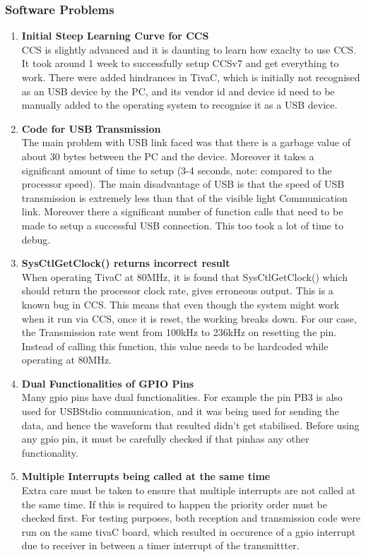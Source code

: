 \documentclass{article}
\begin{document}
\subsubsection{Software Problems}
\begin{enumerate}
\item \textbf{Initial Steep Learning Curve for CCS}\\
  CCS is slightly advanced and it is daunting to learn how exaclty to use CCS. It took around 1 week to successfully setup CCSv7 and get everything to work. There were added hindrances in TivaC, which is initially not recognised as an USB device by the PC, and its vendor id and device id need to be manually added to the operating system to recognise it as a USB device.
\item \textbf{Code for USB Transmission}\\
  The main problem with USB link faced was that there is a garbage value of about 30 bytes between the PC and the device. Moreover it takes a significant amount of time to setup (3-4 seconds, note: compared to the processor speed). The main disadvantage of USB is that the speed of USB transmission is extremely less than that of the visible light Communication link. Moreover there a significant number of function calls that need to be made to setup a successful USB connection. This too took a lot of time to debug.
\item \textbf{SysCtlGetClock() returns incorrect result}\\
  When operating TivaC at 80MHz, it is found that SysCtlGetClock() which should return the processor clock rate, gives erroneous output. This is a known bug in CCS. This means that even though the system might work when it run via CCS, once it is reset, the working breaks down. For our case, the Transmission rate went from 100kHz to 236kHz on resetting the pin. Instead of calling this function, this value needs to be hardcoded while operating at 80MHz.
\item \textbf{Dual Functionalities of GPIO Pins}\\
  Many gpio pins have dual functionalities. For example the pin PB3 is also used for USBStdio communication, and it was being used for sending the data, and hence the waveform that resulted didn't get stabilised. Before using any gpio pin, it must be carefully checked if that pinhas any other functionality.
\item \textbf{Multiple Interrupts being called at the same time}\\
  Extra care must be taken to ensure that multiple interrupts are not called at the same time. If this is required to happen the priority order must be checked first. For testing purposes, both reception and transmission code were run on the same tivaC board, which resulted in occurence of a gpio interrupt due to receiver in between a timer interrupt of the transmittter. 

\end{enumerate}
\end{document}
